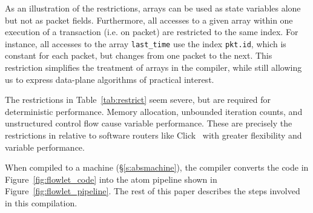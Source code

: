 As an illustration of the restrictions, arrays can be used as state variables
alone but not as packet fields.  Furthermore, all accesses to a given array
within one execution of a transaction (i.e. on packet) are restricted to the
same index. For instance, all accesses to the array \texttt{last\_time} use the
index \texttt{pkt.id}, which is constant for each packet, but changes from one
packet to the next. This restriction simplifies the treatment of arrays in the
compiler, while still allowing us to express data-plane algorithms of practical interest.

The restrictions in Table~\ref{tab:restrict} seem severe, but are required
for deterministic performance.  Memory allocation, unbounded iteration counts,
and unstructured control flow cause variable performance. These are precisely
the restrictions in \pktlanguage relative to software routers like
Click~\cite{click} with greater flexibility and variable performance.

When compiled to a \absmachine machine (\S\ref{s:absmachine}), the \pktlanguage
compiler converts the code in Figure~\ref{fig:flowlet_code} into the atom
pipeline shown in Figure~\ref{fig:flowlet_pipeline}. The rest of this paper
describes the steps involved in this compilation.

%
